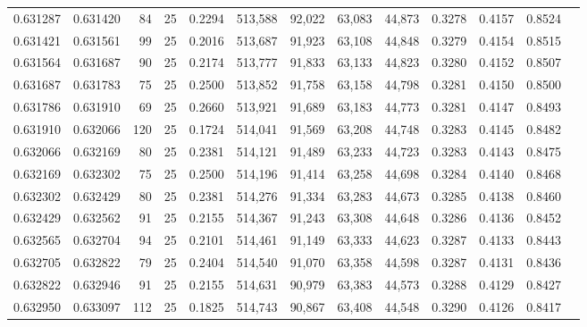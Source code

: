 \begin{tabular}{rrrrrrrrrrrrr}
0.631287 & 0.631420 &    84 &  25 &                                     0.2294 & 513,588 &  92,022 &  63,083 &  44,873 & 0.3278 & 0.4157 & 0.8524 \\
0.631421 & 0.631561 &    99 &  25 &                                     0.2016 & 513,687 &  91,923 &  63,108 &  44,848 & 0.3279 & 0.4154 & 0.8515 \\
0.631564 & 0.631687 &    90 &  25 &                                     0.2174 & 513,777 &  91,833 &  63,133 &  44,823 & 0.3280 & 0.4152 & 0.8507 \\
0.631687 & 0.631783 &    75 &  25 &                                     0.2500 & 513,852 &  91,758 &  63,158 &  44,798 & 0.3281 & 0.4150 & 0.8500 \\
0.631786 & 0.631910 &    69 &  25 &                                     0.2660 & 513,921 &  91,689 &  63,183 &  44,773 & 0.3281 & 0.4147 & 0.8493 \\
0.631910 & 0.632066 &   120 &  25 &                                     0.1724 & 514,041 &  91,569 &  63,208 &  44,748 & 0.3283 & 0.4145 & 0.8482 \\
0.632066 & 0.632169 &    80 &  25 &                                     0.2381 & 514,121 &  91,489 &  63,233 &  44,723 & 0.3283 & 0.4143 & 0.8475 \\
0.632169 & 0.632302 &    75 &  25 &                                     0.2500 & 514,196 &  91,414 &  63,258 &  44,698 & 0.3284 & 0.4140 & 0.8468 \\
0.632302 & 0.632429 &    80 &  25 &                                     0.2381 & 514,276 &  91,334 &  63,283 &  44,673 & 0.3285 & 0.4138 & 0.8460 \\
0.632429 & 0.632562 &    91 &  25 &                                     0.2155 & 514,367 &  91,243 &  63,308 &  44,648 & 0.3286 & 0.4136 & 0.8452 \\
0.632565 & 0.632704 &    94 &  25 &                                     0.2101 & 514,461 &  91,149 &  63,333 &  44,623 & 0.3287 & 0.4133 & 0.8443 \\
0.632705 & 0.632822 &    79 &  25 &                                     0.2404 & 514,540 &  91,070 &  63,358 &  44,598 & 0.3287 & 0.4131 & 0.8436 \\
0.632822 & 0.632946 &    91 &  25 &                                     0.2155 & 514,631 &  90,979 &  63,383 &  44,573 & 0.3288 & 0.4129 & 0.8427 \\
0.632950 & 0.633097 &   112 &  25 &                                     0.1825 & 514,743 &  90,867 &  63,408 &  44,548 & 0.3290 & 0.4126 & 0.8417 \\

\end{tabular}
